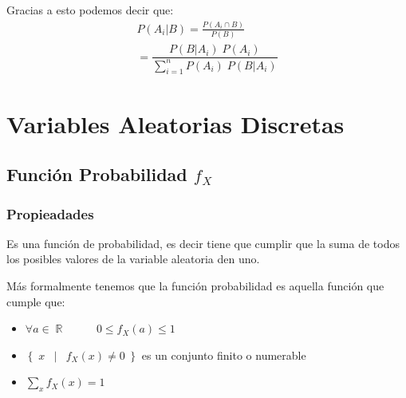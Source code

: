 \documentclass[12pt, fleqn]{report}                             %
\DeclareMathOperator \Space {\quad}                             %
\DeclareMathOperator \MegaSpace {\quad \quad}                   %
\DeclareMathOperator \MiniSpace {\;}                            %
\newcommand \Such {\MiniSpace | \MiniSpace}                     %
\theoremstyle{break}                                            %
\DeclareMathOperator \Reals        {\mathbb{R}}                 %
\newcommand{\Set}[1]{\left\{ \; #1 \; \right\}}                 %
\begin{document}
                Gracias a esto podemos decir que:
                \begin{align*}
                    P(A_i | B) 
                        = \frac{P(A_i \cap B)}{P(B)}                                                        \\
                        = \dfrac{P(B | A_i) \; P(A_i)}{\displaystyle \sum_{i = 1}^n P(A_i) \; P(B | A_i)}
                \end{align*}




        \clearpage
        \section{Variables Aleatorias Discretas}


            \subsection{Función Probabilidad $f_X$}


                \subsubsection{Propieadades}

                    Es una función de probabilidad, es decir tiene que cumplir que la suma de todos los posibles
                    valores de la variable aleatoria den uno.

                    Más formalmente tenemos que la función probabilidad es aquella función que cumple que:
                    \begin{itemize}
                        \item $\forall a \in \Reals \MegaSpace 0 \leq f_X(a) \leq 1$
                        \item $\Set{x \Such f_X(x) \neq 0}$ es un conjunto finito o numerable
                        \item $\displaystyle \sum_x f_X(x) = 1$
                    \end{itemize}
\end{document}

